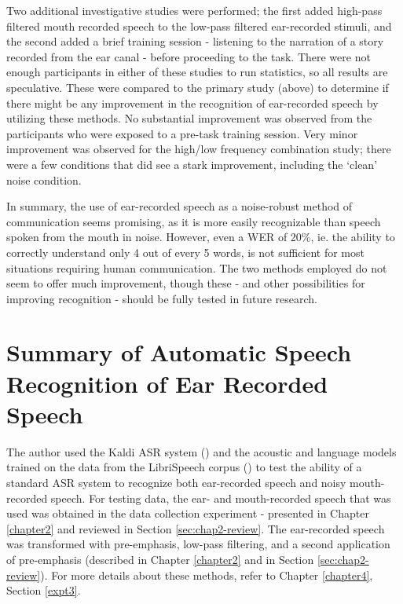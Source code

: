 Two additional investigative studies were performed; the first added high-pass filtered mouth recorded speech to the low-pass filtered ear-recorded stimuli, and the second added a brief training session - listening to the narration of a story recorded from the ear canal - before proceeding to the task.  There were not enough participants in either of these studies to run statistics, so all results are speculative.  These were compared to the primary study (above) to determine if there might be any improvement in the recognition of ear-recorded speech by utilizing these methods.  No substantial improvement was observed from the participants who were exposed to a pre-task training session.  Very minor improvement was observed for the high/low frequency combination study; there were a few conditions that did see a stark improvement, including the `clean' noise condition.

In summary, the use of ear-recorded speech as a noise-robust method of communication seems promising, as it is more easily recognizable than speech spoken from the mouth in noise.  However, even a WER of 20\%, ie. the ability to correctly understand only 4 out of every 5 words, is not sufficient for most situations requiring human communication.  The two methods employed do not seem to offer much improvement, though these - and other possibilities for improving recognition - should be fully tested in future research.



\section{Summary of Automatic Speech Recognition of Ear Recorded Speech}\label{sec:chap4-review}

The author used the Kaldi ASR system (\cite{povey:11}) and the acoustic and language models trained on the data from the LibriSpeech corpus (\cite{panayotov:15}) to test the ability of a standard ASR system to recognize both ear-recorded speech and noisy mouth-recorded speech.  For testing data, the ear- and mouth-recorded speech that was used was obtained in the data collection experiment - presented in Chapter \ref{chapter2} and reviewed in Section \ref{sec:chap2-review}.  The ear-recorded speech was transformed with pre-emphasis, low-pass filtering, and a second application of pre-emphasis (described in Chapter \ref{chapter2} and in Section \ref{sec:chap2-review}). For more details about these methods, refer to Chapter \ref{chapter4}, Section \ref{expt3}.

